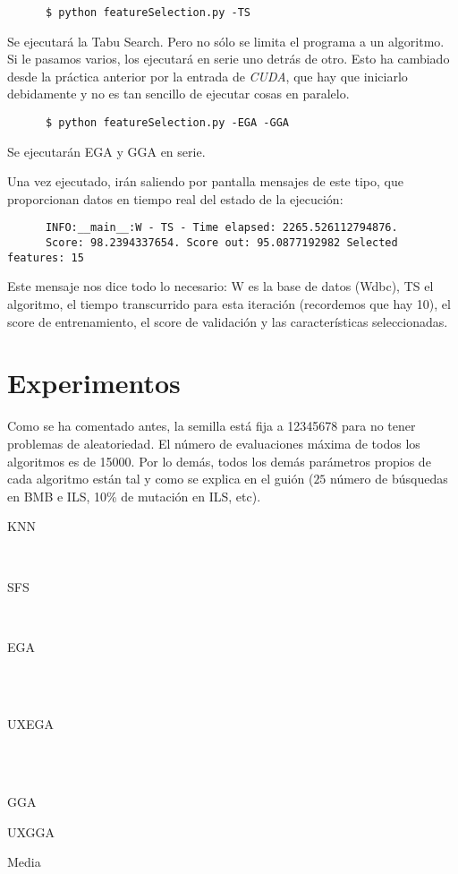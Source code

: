 \documentclass[a4paper, 11pt]{article}
\begin{document}
    \begin{verbatim}
      $ python featureSelection.py -TS
    \end{verbatim}
    Se ejecutará la Tabu Search. Pero no sólo se limita el programa a un algoritmo. Si le pasamos varios, los ejecutará en serie uno detrás de otro. Esto ha cambiado desde la práctica anterior por la entrada de \emph{CUDA}, que hay que iniciarlo debidamente y no es tan sencillo de ejecutar cosas en paralelo.

    \begin{verbatim}
      $ python featureSelection.py -EGA -GGA
    \end{verbatim}
    Se ejecutarán EGA y GGA en serie.

    Una vez ejecutado, irán saliendo por pantalla mensajes de este tipo, que proporcionan datos en tiempo real del estado de la ejecución:

    \begin{verbatim}
      INFO:__main__:W - TS - Time elapsed: 2265.526112794876.
      Score: 98.2394337654. Score out: 95.0877192982 Selected features: 15
    \end{verbatim}

    Este mensaje nos dice todo lo necesario: W es la base de datos (Wdbc), TS el algoritmo, el tiempo transcurrido para esta iteración (recordemos que hay 10), el score de entrenamiento, el score de validación y las características seleccionadas.
  \section{Experimentos}
    Como se ha comentado antes, la semilla está fija a 12345678 para no tener problemas de aleatoriedad. El número de evaluaciones máxima de todos los algoritmos es de 15000. Por lo demás, todos los demás parámetros propios de cada algoritmo están tal y como se explica en el guión ($25$ número de búsquedas en BMB e ILS, 10\% de mutación en ILS, etc). \\

    \newpage

    \centerline{KNN}
    \\
    \centerline{SFS}
    
    \\ \centerline{EGA}
    \\
    \\ \centerline{UXEGA}
    \\
    \\ \centerline{GGA}
    
    \newpage
    \centerline{UXGGA}
    
    \centerline{Media}
    \\
\end{document}
